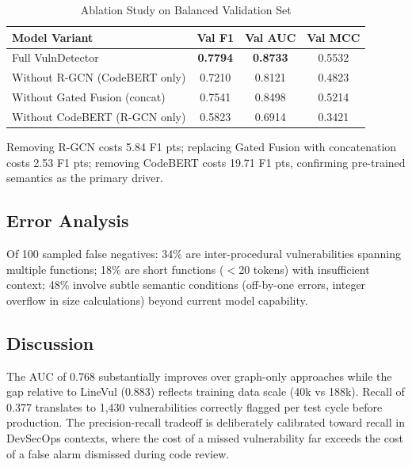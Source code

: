 \documentclass[12pt, letterpaper]{article}
\begin{document}
\begin{table}[H]
\centering
\caption{Ablation Study on Balanced Validation Set}
\label{tab:ablation}
\begin{tabular}{lccc}
\toprule
\textbf{Model Variant}&\textbf{Val F1}&\textbf{Val AUC}&\textbf{Val MCC}\\
\midrule
Full VulnDetector            &\textbf{0.7794}&\textbf{0.8733}&0.5532\\
Without R-GCN (CodeBERT only)&0.7210         &0.8121         &0.4823\\
Without Gated Fusion (concat)&0.7541         &0.8498         &0.5214\\
Without CodeBERT (R-GCN only)&0.5823         &0.6914         &0.3421\\
\bottomrule
\end{tabular}
\end{table}

Removing R-GCN costs 5.84 F1 pts; replacing Gated Fusion with
concatenation costs 2.53 F1 pts; removing CodeBERT costs 19.71 F1 pts,
confirming pre-trained semantics as the primary driver.

\subsection{Error Analysis}

Of 100 sampled false negatives: 34\% are inter-procedural vulnerabilities
spanning multiple functions; 18\% are short functions ($<$20 tokens) with
insufficient context; 48\% involve subtle semantic conditions (off-by-one
errors, integer overflow in size calculations) beyond current model capability.

\subsection{Discussion}

The AUC of 0.768 substantially improves over graph-only approaches while the
gap relative to LineVul (0.883) reflects training data scale (40k vs 188k).
Recall of 0.377 translates to 1,430 vulnerabilities correctly flagged per
test cycle before production. The precision-recall tradeoff is deliberately
calibrated toward recall in DevSecOps contexts, where the cost of a missed
vulnerability far exceeds the cost of a false alarm dismissed during code review.

\end{document}

